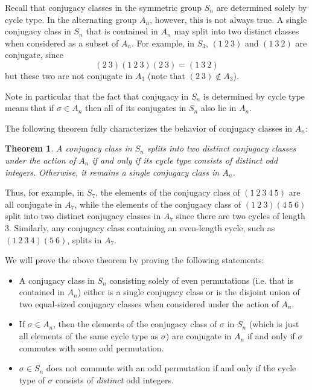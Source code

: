 \documentclass[12pt]{article}
\newtheorem{thm}{Theorem}
\begin{document}
Recall that conjugacy classes in the symmetric group $S_n$ are determined solely by cycle type. In the alternating group $A_n$, however, this is not always true. A single conjugacy class in $S_n$ that is contained in $A_n$ may split into two distinct classes when considered as a subset of $A_n$. For example, in $S_3$, $(1~2~3)$ and $(1~3~2)$ are conjugate, since
\[(2~3)(1~2~3)(2~3)=(1~3~2)\]
but these two are not conjugate in $A_3$ (note that $(2~3)\notin A_3$).

Note in particular that the fact that conjugacy in $S_n$ is determined by cycle type means that if $\sigma\in A_n$ then all of its conjugates in $S_n$ also lie in $A_n$.

The following theorem fully characterizes the behavior of conjugacy classes in $A_n$:
\begin{thm} A conjugacy class in $S_n$ splits into two distinct conjugacy classes under the action of $A_n$ if and only if its cycle type consists of \emph{distinct} odd integers. Otherwise, it remains a single conjugacy class in $A_n$.
\end{thm}

Thus, for example, in $S_7$, the elements of the conjugacy class of $(1~2~3~4~5)$ are all conjugate in $A_7$, while the elements of the conjugacy class of $(1~2~3)(4~5~6)$ split into two distinct conjugacy classes in $A_7$ since there are two cycles of length $3$. Similarly, any conjugacy class containing an even-length cycle, such as $(1~2~3~4)(5~6)$, splits in $A_7$.

We will prove the above theorem by proving the following statements:
\begin{itemize}
\item A conjugacy class in $S_n$ consisting solely of even permutations (i.e. that is contained in $A_n$) either is a single conjugacy class or is the disjoint union of two equal-sized conjugacy classes when considered under the action of $A_n$.
\item If $\sigma\in A_n$, then the elements of the conjugacy class of $\sigma$ in $S_n$ (which is just all elements of the same cycle type as $\sigma$) are conjugate in $A_n$ if and only if $\sigma$ commutes with some odd permutation.
\item $\sigma\in S_n$ does not commute with an odd permutation if and only if the cycle type of $\sigma$ consists of \emph{distinct} odd integers.
\end{itemize}
\end{document}
